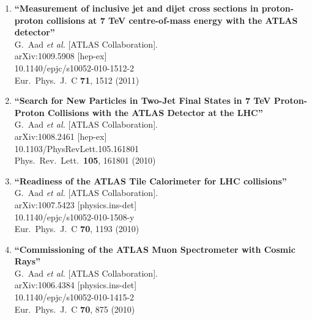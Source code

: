 \documentclass{article}
\begin{document}
\begin{enumerate}
\item%
{\bf ``Measurement of inclusive jet and dijet cross sections in proton-proton collisions at 7 TeV centre-of-mass energy with the ATLAS detector''}
  \\{}G.~Aad {\it et al.}  [ATLAS Collaboration].
  \\{}arXiv:1009.5908 [hep-ex]
    \\{}10.1140/epjc/s10052-010-1512-2
\\{}Eur.\ Phys.\ J.\ C {\bf 71}, 1512 (2011) %


\item%
{\bf ``Search for New Particles in Two-Jet Final States in 7 TeV Proton-Proton Collisions with the ATLAS Detector at the LHC''}
  \\{}G.~Aad {\it et al.}  [ATLAS Collaboration].
  \\{}arXiv:1008.2461 [hep-ex]
    \\{}10.1103/PhysRevLett.105.161801
\\{}Phys.\ Rev.\ Lett.\  {\bf 105}, 161801 (2010) %


\item%
{\bf ``Readiness of the ATLAS Tile Calorimeter for LHC collisions''}
  \\{}G.~Aad {\it et al.}  [ATLAS Collaboration].
  \\{}arXiv:1007.5423 [physics.ins-det]
    \\{}10.1140/epjc/s10052-010-1508-y
\\{}Eur.\ Phys.\ J.\ C {\bf 70}, 1193 (2010) %


\item%
{\bf ``Commissioning of the ATLAS Muon Spectrometer with Cosmic Rays''}
  \\{}G.~Aad {\it et al.}  [ATLAS Collaboration].
  \\{}arXiv:1006.4384 [physics.ins-det]
    \\{}10.1140/epjc/s10052-010-1415-2
\\{}Eur.\ Phys.\ J.\ C {\bf 70}, 875 (2010) %



\end{enumerate}
\end{document}
